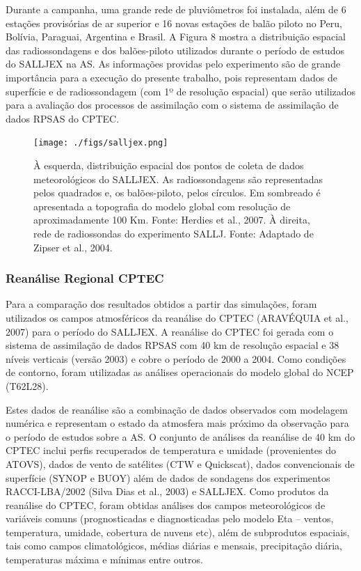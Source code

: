 Durante a campanha, uma grande rede de pluviômetros foi instalada, além de 6 estações provisórias de ar superior e 16 novas estações de balão piloto no Peru, Bolívia, Paraguai, Argentina e Brasil. A Figura 8 mostra a distribuição espacial das radiossondagens e dos balões-piloto utilizados durante o período de estudos do SALLJEX na AS. As informações providas pelo experimento são de grande importância para a execução do presente trabalho, pois representam dados de superfície e de radiossondagem (com 1º de resolução espacial) que serão utilizados para a avaliação dos processos de assimilação com o sistema de assimilação de dados RPSAS do CPTEC.

\begin{figure}[!hbp]
\texttt{[image: ./figs/salljex.png]}
\caption{À esquerda, distribuição espacial dos pontos de coleta de dados meteorológicos do SALLJEX. As radiossondagens são representadas pelos quadrados e, os balões-piloto, pelos círculos. Em sombreado é apresentada a topografia do modelo global com resolução de aproximadamente 100 Km. Fonte: Herdies et al., 2007. À direita, rede de radiossondas do experimento SALLJ. Fonte: Adaptado de Zipser et al., 2004.}
\label{fig06}
\end{figure}

\subsubsection{Reanálise Regional CPTEC}

Para a comparação dos resultados obtidos a partir das simulações, foram utilizados os campos atmosféricos da reanálise do CPTEC (ARAVÉQUIA et al., 2007) para o período do SALLJEX. A reanálise do CPTEC foi gerada com o sistema de assimilação de dados RPSAS com 40 km de resolução espacial e 38 níveis verticais (versão 2003) e cobre o período de 2000 a 2004. Como condições de contorno, foram utilizadas as análises operacionais do modelo global do NCEP (T62L28). 

Estes dados de reanálise são a combinação de dados observados com modelagem numérica e representam o estado da atmosfera mais próximo da observação para o período de estudos sobre a AS. O conjunto de análises da reanálise de 40 km do CPTEC inclui perfis recuperados de temperatura e umidade (provenientes do ATOVS), dados de vento de satélites (CTW e Quickscat), dados convencionais de superfície (SYNOP e BUOY) além de dados de sondagens dos experimentos RACCI-LBA/2002 (Silva Dias et al., 2003) e SALLJEX. Como produtos da reanálise do CPTEC, foram obtidas análises dos campos meteorológicos de variáveis comuns (prognosticadas e diagnosticadas pelo modelo Eta – ventos, temperatura, umidade, cobertura de nuvens etc), além de subprodutos espaciais, tais como campos climatológicos, médias diárias e mensais, precipitação diária, temperaturas máxima e mínimas entre outros.

